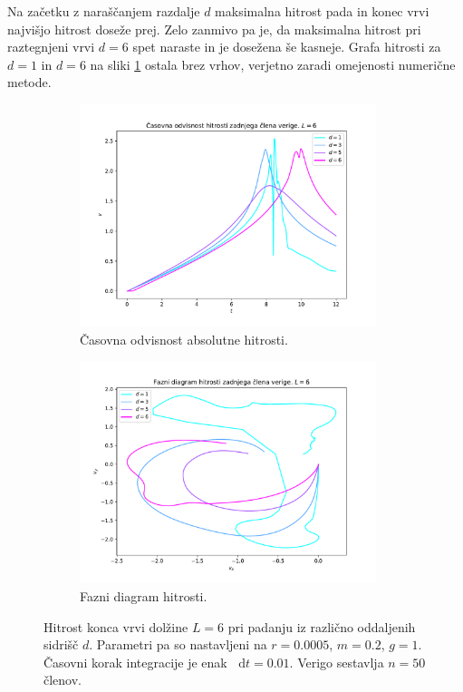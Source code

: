 \documentclass[a4paper, 12pt, slovene]{article}
\newcommand*\diff{\mathop{}\!\mathrm{d}}
\numberwithin{equation}{section}
\begin{document}
Na začetku z naraščanjem razdalje $d$ maksimalna hitrost pada in konec vrvi najvišjo hitrost doseže prej. Zelo zanmivo pa je, da maksimalna hitrost pri raztegnjeni vrvi $d=6$ spet naraste in je dosežena še kasneje. Grafa hitrosti za $d=1$ in $d=6$ na sliki \ref{f:hor-v} ostala brez vrhov, verjetno zaradi omejenosti numerične metode.


\begin{figure}[H]
\centering
\begin{subfigure}{0.495\textwidth}
	\centering
	\includegraphics[width=0.95\textwidth]{grafi/hitrost_siroko.pdf}
	\caption{Časovna odvisnost absolutne hitrosti.}
	\label{f:hor-v}
\end{subfigure}
\begin{subfigure}{0.495\textwidth}
	\centering
	\includegraphics[width=0.95\textwidth]{grafi/hitrost_siroko_xy.pdf}
	\caption{Fazni diagram hitrosti.}
	\label{f:hor-v-fd}
\end{subfigure}
\caption{Hitrost konca vrvi dolžine $L=6$ pri padanju iz različno oddaljenih sidrišč $d$. Parametri pa so nastavljeni na $r=0.0005$, $m=0.2$, $g=1$. Časovni korak integracije je enak $\diff t = 0.01$. Verigo sestavlja $n=50$ členov.}
\label{f:horizontalno-hitrosti}
\end{figure}
\end{document}
